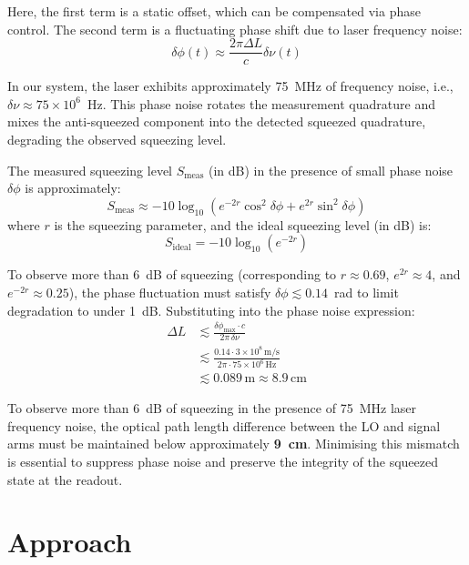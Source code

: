 \documentclass[colorlinks=true,pdfstartview=FitV,linkcolor=blue,
citecolor=red,urlcolor=magenta]{ligodoc}
\begin{document}
Here, the first term is a static offset, which can be compensated via phase control. The second term is a fluctuating phase shift due to laser frequency noise:
\begin{equation}
    \delta \phi(t) \approx \frac{2\pi \Delta L}{c} \delta \nu(t)
\end{equation}

In our system, the laser exhibits approximately 75~MHz of frequency noise, i.e., \( \delta \nu \approx 75 \times 10^6 \)~Hz. This phase noise rotates the measurement quadrature and mixes the anti-squeezed component into the detected squeezed quadrature, degrading the observed squeezing level.

The measured squeezing level \( S_{\text{meas}} \) (in dB) in the presence of small phase noise \( \delta \phi \) is approximately:
\begin{equation}
    S_{\text{meas}} \approx -10 \log_{10} \left( e^{-2r} \cos^2 \delta \phi + e^{2r} \sin^2 \delta \phi \right)
\end{equation}
where \( r \) is the squeezing parameter, and the ideal squeezing level (in dB) is:
\begin{equation}
    S_{\text{ideal}} = -10 \log_{10}(e^{-2r})
\end{equation}

To observe more than 6~dB of squeezing (corresponding to \( r \approx 0.69 \), \( e^{2r} \approx 4 \), and \( e^{-2r} \approx 0.25 \)), the phase fluctuation must satisfy \( \delta \phi \lesssim 0.14 \)~rad to limit degradation to under 1~dB. Substituting into the phase noise expression:
\begin{align}
    \Delta L &\lesssim \frac{\delta \phi_{\text{max}} \cdot c}{2\pi \, \delta \nu} \\
             &\lesssim \frac{0.14 \cdot 3 \times 10^8 \, \text{m/s}}{2\pi \cdot 75 \times 10^6 \, \text{Hz}} \\
             &\lesssim 0.089 \, \text{m} \approx 8.9 \, \text{cm}
\end{align}

To observe more than 6~dB of squeezing in the presence of 75~MHz laser frequency noise, the optical path length difference between the LO and signal arms must be maintained below approximately \textbf{9~cm}. Minimising this mismatch is essential to suppress phase noise and preserve the integrity of the squeezed state at the readout.

\section{Approach}
\end{document}
